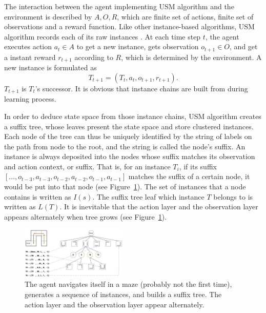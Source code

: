 \documentclass{article}
\begin{document}
The interaction between the agent implementing USM algorithm and the environment is described by
$A, O, R$, which are finite set of actions, finite set of observations and a reward function.
Like other instance-based algorithms, USM algorithm records each of its raw instances
\cite{mccallum1995instance}. At each time step $t$, the agent executes action
$a_t \in A$ to get a new instance, gets observation $o_{t+1} \in O$, and get a
instant reward $r_{t+1}$ according to $R$, which is determined by the environment.
A new instance is formulated as
\begin{equation}
  T_{t+1}= (T_t, a_t, o_{t+1}, r_{t+1}). \label{equ:instance}
\end{equation}
$T_{t+1}$ is $T_t$'s successor. It is obvious that instance chains are built
from during learning process.

In order to deduce state space from those instance chains, USM algorithm creates a suffix tree,
whose leaves present the state space and store clustered instances. Each node of the tree
can thus be uniquely identified by the string of labels on the path from node to the root,
and the string is called the node’s suffix. An instance is always deposited into the
nodes whose suffix matches its observation and action context, or suffix. That is,
for an instance $T_i$, if its suffix $[..., o_{t-3}, a_{t-3}, o_{t-2}, a_{t-2}, o_{t-1}, a_{t-1}]$
matches the suffix of a certain node, it would be put into that node (see Figure~\ref{fig:suffix tree}).
The set of instances that a node contains is written as $I(s)$. The suffix tree leaf which
instance $T$ belongs to is written as $L(T)$. It is inevitable that the action layer and
the observation layer appears alternately when tree grows (see Figure~\ref{fig:suffix tree}).

\begin{figure}[h]
  \centering
    \includegraphics[width=0.45\textwidth]{usm_sample.jpg}
  \caption{The agent navigates itself in a maze (probably not the first time), generates
  a sequence of instances, and builds a suffix tree. The action layer and
  the observation layer appear alternately.}
  \label{fig:suffix tree}
\end{figure}
\end{document}
